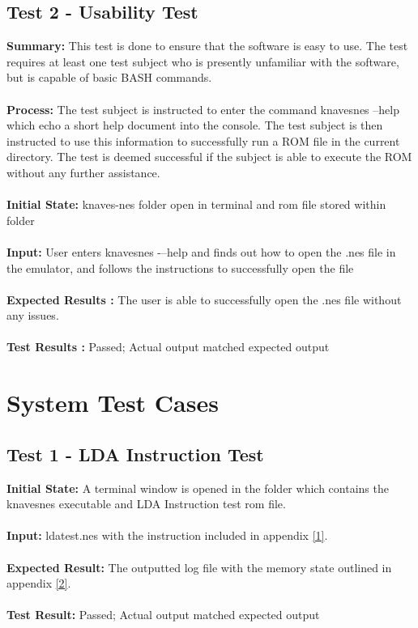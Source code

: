 \documentclass[12pt]{article}
\begin{document}
	\subsection{Test 2 - Usability Test}
		\textbf{Summary: } This test is done to ensure that the software is easy to use. The test requires at least one test subject who is presently unfamiliar with the software, but is capable of basic BASH commands.\\\\
		\textbf{Process: } The test subject is instructed to enter the command knavesnes --help which echo a short help document into the console. The test subject is then instructed to use this information to successfully run a ROM file in the current directory. The test is deemed successful if the subject is able to execute the ROM without any further assistance. \\\\
		\textbf{Initial State: } knaves-nes folder open in terminal and rom file stored within folder\\\\
		\textbf{Input: } User enters knavesnes -–help and finds out how to open the .nes file in the emulator, and follows the instructions to successfully open the file\\\\
		\textbf{Expected Results :} The user is able to successfully open the .nes file without any issues. \\\\
		\textbf{Test Results :} Passed; Actual output matched expected output

\section{System Test Cases}
	\subsection{Test 1 - LDA Instruction Test}
		\textbf{Initial State: } A terminal window is opened in the folder which contains the knavesnes executable and LDA Instruction test rom file.\\\\
		\textbf{Input: } ldatest.nes with the instruction included in appendix \hyperlink{appendix}{[1]}.\\\\
		\textbf{Expected Result: } The outputted log file with the memory state outlined in appendix \hyperlink{appendix}{[2]}.\\\\
		\textbf{Test Result: } Passed; Actual output matched expected output
\end{document}
